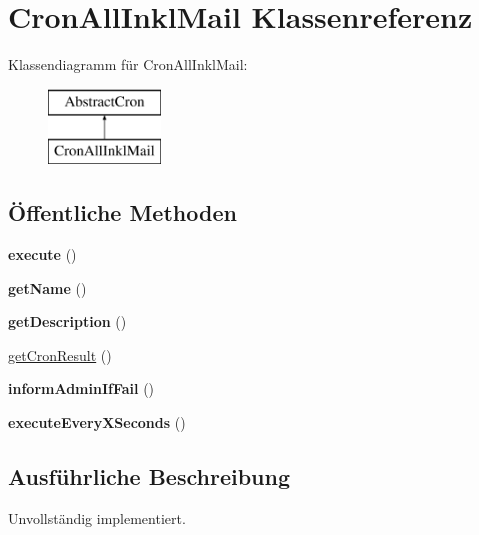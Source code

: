 \hypertarget{class_cron_all_inkl_mail}{}\section{Cron\+All\+Inkl\+Mail Klassenreferenz}
\label{class_cron_all_inkl_mail}
Klassendiagramm für Cron\+All\+Inkl\+Mail\+:\begin{figure}[H]
\begin{center}
\leavevmode
\includegraphics[height=2.000000cm]{class_cron_all_inkl_mail}
\end{center}
\end{figure}
\subsection*{Öffentliche Methoden}
\begin{DoxyCompactItemize}
\item 
\mbox{\label{class_cron_all_inkl_mail_ac41009cc8140a06f00a2578876335d39}} 
{\bfseries execute} ()
\item 
\mbox{\label{class_cron_all_inkl_mail_a30c67dc843265e60af389d1f0af8c09d}} 
{\bfseries get\+Name} ()
\item 
\mbox{\label{class_cron_all_inkl_mail_ae33688457aa3d8a875af085d84cf1aa9}} 
{\bfseries get\+Description} ()
\item 
\mbox{\hyperlink{class_cron_all_inkl_mail_a4ce35ab45888b9bc2767313093424008}{get\+Cron\+Result}} ()
\item 
\mbox{\label{class_cron_all_inkl_mail_ab7098db6f06e55e430ba1d0c8ee31306}} 
{\bfseries inform\+Admin\+If\+Fail} ()
\item 
\mbox{\label{class_cron_all_inkl_mail_af1aab44f069b71f921ef408d487b63c4}} 
{\bfseries execute\+Every\+X\+Seconds} ()
\end{DoxyCompactItemize}


\subsection{Ausführliche Beschreibung}
Unvollständig implementiert. 

